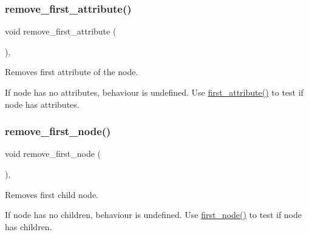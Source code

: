 \subsubsection{\texorpdfstring{remove\+\_\+first\+\_\+attribute()}{remove\_first\_attribute()}}
{\footnotesize\ttfamily void remove\+\_\+first\+\_\+attribute (\begin{DoxyParamCaption}{ }\end{DoxyParamCaption})\hspace{0.3cm}{\ttfamily [inline]}, {\ttfamily [inherited]}}



Removes first attribute of the node. 

If node has no attributes, behaviour is undefined. Use \mbox{\hyperlink{classrapidxml_1_1xml__node_a3cbbee0d76d96c3315cc9d80d169c8d9}{first\+\_\+attribute()}} to test if node has attributes. \mbox{\label{classrapidxml_1_1xml__node_a9a31d861e1bddc710839c551a5d2b3a4}} 
\subsubsection{\texorpdfstring{remove\+\_\+first\+\_\+node()}{remove\_first\_node()}}
{\footnotesize\ttfamily void remove\+\_\+first\+\_\+node (\begin{DoxyParamCaption}{ }\end{DoxyParamCaption})\hspace{0.3cm}{\ttfamily [inline]}, {\ttfamily [inherited]}}



Removes first child node. 

If node has no children, behaviour is undefined. Use \mbox{\hyperlink{classrapidxml_1_1xml__node_a1290dd3cfbf7cc6384593104635c96cd}{first\+\_\+node()}} to test if node has children. \mbox{\label{classrapidxml_1_1xml__node_a37d87c4d5d89fa0cf05b72ee8d4cba3b}} 
